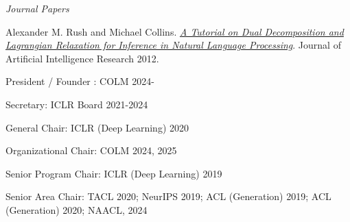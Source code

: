 \documentclass[10pt]{article}
\begin{document}
\noindent\emph{Journal Papers \vspace{0.01in}}

\ind Alexander M. Rush and Michael Collins. \emph{\href{http://www.cs.columbia.edu/~mcollins/acltutorial.pdf}{A Tutorial on Dual Decomposition and Lagrangian Relaxation for Inference in Natural Language Processing}}. Journal of Artificial Intelligence Research 2012.









\medskip


\bigskip

\ind President / Founder :
\ind COLM 2024-

\ind Secretary:
\ind ICLR Board 2021-2024

\ind General  Chair:
\ind ICLR (Deep Learning) 2020

\ind Organizational Chair:
\ind COLM 2024, 2025

\ind Senior Program Chair:
\ind ICLR (Deep Learning) 2019

\ind Senior Area Chair:
\ind TACL 2020; NeurIPS 2019; ACL (Generation) 2019; ACL (Generation) 2020; NAACL, 2024
\end{document}
